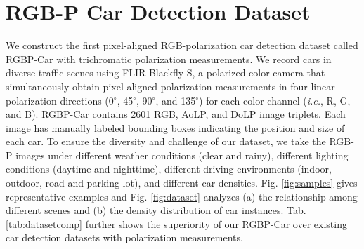 \section{RGB-P Car Detection Dataset}
\label{sec:dataset}
We construct the first pixel-aligned RGB-polarization car detection dataset called RGBP-Car with trichromatic polarization measurements. We record cars in diverse traffic scenes using FLIR-Blackfly-S, a polarized color camera that simultaneously obtain pixel-aligned polarization measurements in four linear polarization directions (0$^\circ$, 45$^\circ$, 90$^\circ$, and 135$^\circ$) for each color channel (\textit{i.e.}, R, G, and B). RGBP-Car contains 2601 RGB, AoLP, and DoLP image triplets. Each image has manually labeled bounding boxes indicating the position and size of each car. To ensure the diversity and challenge of our dataset, we take the RGB-P images under different weather conditions (clear and rainy), different lighting conditions (daytime and nighttime), different driving environments (indoor, outdoor, road and parking lot), and different car densities. 
Fig. \ref{fig:samples} gives representative examples and Fig. \ref{fig:dataset} analyzes (a) the relationship among different scenes and (b) the density distribution of car instances. Tab. \ref{tab:datasetcomp} further shows the superiority of our RGBP-Car over existing car detection datasets with polarization measurements.

